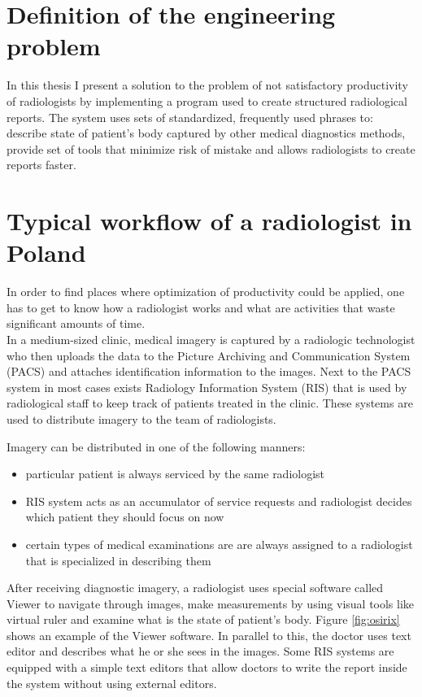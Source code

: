 \documentclass[12pt, twoside, openany]{report}
\theoremstyle{definition}
\begin{document}
\section{Definition of the engineering problem}
In this thesis I present a solution to the problem of not satisfactory productivity of radiologists by implementing a program used to create structured radiological reports. The system uses sets of standardized, frequently used phrases to: describe state of patient's body captured by other medical diagnostics methods, provide set of tools that minimize risk of mistake and allows radiologists to create reports faster. 

\section{Typical workflow of a radiologist in Poland}
In order to find places where optimization of productivity could be applied, one has to get to know how a radiologist works and what are activities that waste significant amounts of time. \\
In a medium-sized clinic, medical imagery is captured by a radiologic technologist who then uploads the data to the Picture Archiving and Communication System (PACS) and attaches identification information to the images. Next to the PACS system in most cases exists Radiology Information System (RIS) that is used by radiological staff to keep track of patients treated in the clinic. These systems are used to distribute imagery to the team of radiologists.

Imagery can be distributed in one of the following manners:
\begin{itemize}
    \item particular patient is always serviced by the same radiologist
    \item RIS system acts as an accumulator of service requests and radiologist decides which patient they should focus on now
    \item certain types of medical examinations are are always assigned to a radiologist that is specialized in describing them
\end{itemize}

After receiving diagnostic imagery, a radiologist uses special software called Viewer\cite{viewer} to navigate through images, make measurements by using visual tools like virtual ruler and examine what is the state of patient's body. Figure \ref{fig:osirix} shows an example of the Viewer software. In parallel to this, the doctor uses text editor and describes what he or she sees in the images. Some RIS systems are equipped with a simple text editors that allow doctors to write the report inside the system without using external editors. 
\end{document}
